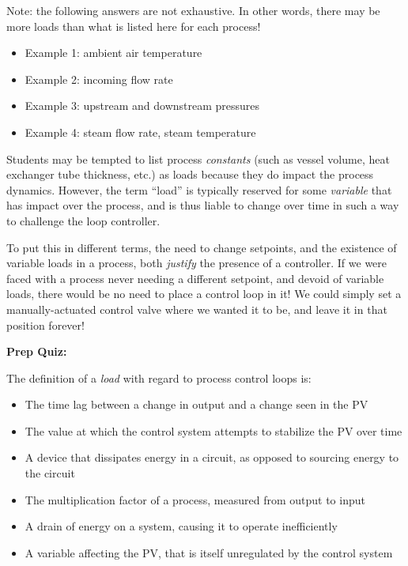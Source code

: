 \vskip 10pt

Note: the following answers are not exhaustive.  In other words, there may be more loads than what is listed here for each process!

\begin{itemize}
\item{} Example 1: ambient air temperature
\item{} Example 2: incoming flow rate
\item{} Example 3: upstream and downstream pressures
\item{} Example 4: steam flow rate, steam temperature
\end{itemize}







Students may be tempted to list process {\it constants} (such as vessel volume, heat exchanger tube thickness, etc.) as loads because they do impact the process dynamics.  However, the term ``load'' is typically reserved for some {\it variable} that has impact over the process, and is thus liable to change over time in such a way to challenge the loop controller.

To put this in different terms, the need to change setpoints, and the existence of variable loads in a process, both {\it justify} the presence of a controller.  If we were faced with a process never needing a different setpoint, and devoid of variable loads, there would be no need to place a control loop in it!  We could simply set a manually-actuated control valve where we wanted it to be, and leave it in that position forever!

\vfil \eject

\noindent
{\bf Prep Quiz:}

The definition of a {\it load} with regard to process control loops is:

\begin{itemize}
\item{} The time lag between a change in output and a change seen in the PV
\vskip 5pt 
\item{} The value at which the control system attempts to stabilize the PV over time
\vskip 5pt 
\item{} A device that dissipates energy in a circuit, as opposed to sourcing energy to the circuit
\vskip 5pt 
\item{} The multiplication factor of a process, measured from output to input
\vskip 5pt 
\item{} A drain of energy on a system, causing it to operate inefficiently
\vskip 5pt 
\item{} A variable affecting the PV, that is itself unregulated by the control system
\end{itemize}






